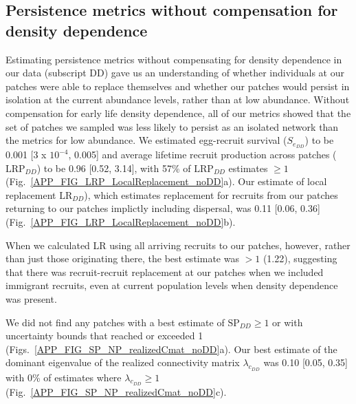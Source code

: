 \documentclass[12pt, oneside]{article}   	%
\begin{document}

\subsection{Persistence metrics without compensation for density dependence} \label{APP_SEC_RESULTS_noDD} %
Estimating persistence metrics without compensating for density dependence in our data (subscript DD) gave us an understanding of whether individuals at our patches were able to replace themselves and whether our patches would persist in isolation at the current abundance levels, rather than at low abundance. Without compensation for early life density dependence, all of our metrics showed that the set of patches we sampled was less likely to persist as an isolated network than the metrics for low abundance. We estimated egg-recruit survival ($S_{e_{DD}}$) to be 0.001 [3 x $10^{-4}$, 0.005] and average lifetime recruit production across patches ($\text{LRP}_{DD}$) to be 0.96 [0.52, 3.14], with 57\% of $\text{LRP}_{DD}$ estimates $\geq 1$ (Fig.\ \ref{APP_FIG_LRP_LocalReplacement_noDD}a). Our estimate of local replacement $\text{LR}_{DD}$), which estimates replacement for recruits from our patches returning to our patches implictly including dispersal, was 0.11 [0.06, 0.36] (Fig.\ \ref{APP_FIG_LRP_LocalReplacement_noDD}b). 

When we calculated LR using all arriving recruits to our patches, however, rather than just those originating there, the best estimate was $> 1$ (1.22), suggesting that there was recruit-recruit replacement at our patches when we included immigrant recruits, even at current population levels when density dependence was present.

We did not find any patches with a best estimate of $\text{SP}_{DD} \geq 1$ or with uncertainty bounds that reached or exceeded 1 (Figs.\ \ref{APP_FIG_SP_NP_realizedCmat_noDD}a). Our best estimate of the dominant eigenvalue of the realized connectivity matrix $\lambda_{c_{DD}}$ was 0.10 [0.05, 0.35] with 0\% of estimates where $\lambda_{c_{DD}} \geq 1$ (Fig.\ \ref{APP_FIG_SP_NP_realizedCmat_noDD}c). 
\end{document}
